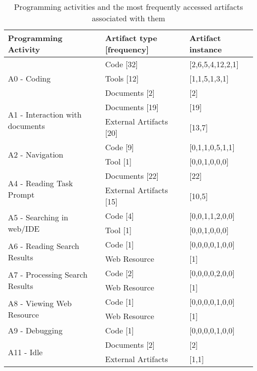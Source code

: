 
\begin{table}[hbt]
\caption{Programming activities and the most frequently accessed artifacts associated with them}
\label{tab:programming-activities}
\begin{tabular}{p{1in}lp{0.7in}}
\toprule
Programming Activity & Artifact type [frequency] & Artifact instance \\
\midrule
\multirow{3}{1in}{A0 - Coding} & Code [32] & [2,6,5,4,12,2,1] \\
& Tools [12] & [1,1,5,1,3,1] \\
& Documents [2] & [2] \\
\midrule
\multirow{2}{1in}{A1 - Interaction with documents} & Documents [19] & [19] \\
& External Artifacts [20] & [13,7] \\
\midrule
\multirow{2}{*}{A2 - Navigation} & Code [9] & [0,1,1,0,5,1,1] \\
& Tool [1] & [0,0,1,0,0,0] \\
\midrule
\multirow{2}{1in}{A4 - Reading Task Prompt} & Documents [22] & [22] \\
& External Artifacts [15] & [10,5] \\
\midrule
\multirow{2}{1in}{A5 - Searching in web/IDE} & Code [4] & [0,0,1,1,2,0,0] \\
& Tool [1] & [0,0,1,0,0,0] \\
\midrule
\multirow{2}{1in}{A6 - Reading Search Results} & Code [1] & [0,0,0,0,1,0,0] \\
& Web Resource & [1] \\
\midrule
\multirow{2}{1in}{A7 - Processing Search Results} & Code [2] & [0,0,0,0,2,0,0] \\
& Web Resource & [1] \\
\midrule
\multirow{2}{1in}{A8 - Viewing Web Resource} & Code [1] & [0,0,0,0,1,0,0] \\
& Web Resource & [1] \\
\midrule
A9 - Debugging & Code [1] & [0,0,0,0,1,0,0] \\
\midrule
\multirow{2}{*}{A11 - Idle} & Documents [2] & [2] \\
& External Artifacts & [1,1] \\
\bottomrule
\end{tabular}
\end{table}